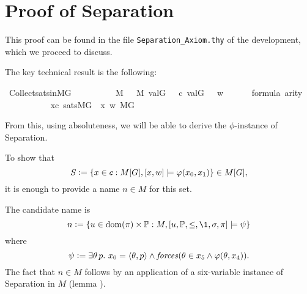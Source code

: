 \section{Proof of Separation}

This proof can be found in the file \verb|Separation_Axiom.thy| of the
development, which we proceed to discuss.

The key technical result is the following:
\begin{isabelle}
  \isamarkupfalse%
  \ Collect{\isacharunderscore}sats{\isacharunderscore}in{\isacharunderscore}MG\ {\isacharcolon}\isanewline
  \ \ \isanewline
  \ \ \ \ {\isachardoublequoteopen}{\isasympi}\ {\isasymin}\ M{\isachardoublequoteclose}\ {\isachardoublequoteopen}{\isasymsigma}\ {\isasymin}\ M{\isachardoublequoteclose}\ {\isachardoublequoteopen}val{\isacharparenleft}G{\isacharcomma}\ {\isasympi}{\isacharparenright}\ {\isacharequal}\ c{\isachardoublequoteclose}\ {\isachardoublequoteopen}val{\isacharparenleft}G{\isacharcomma}\ {\isasymsigma}{\isacharparenright}\ {\isacharequal}\ w{\isachardoublequoteclose}\isanewline
  \ \ \ \ {\isachardoublequoteopen}{\isasymphi}\ {\isasymin}\ formula{\isachardoublequoteclose}\ {\isachardoublequoteopen}arity{\isacharparenleft}{\isasymphi}{\isacharparenright}\ {\isasymle}\ {}{\isachardoublequoteclose}\isanewline
  \ \ \ \ \ \ \isanewline
  \ \ \ \ {\isachardoublequoteopen}{\isacharbraceleft}x{\isasymin}c{\isachardot}\ sats{\isacharparenleft}M{\isacharbrackleft}G{\isacharbrackright}{\isacharcomma}\ {\isasymphi}{\isacharcomma}\ {\isacharbrackleft}x{\isacharcomma}\ w{\isacharbrackright}{\isacharparenright}{\isacharbraceright}{\isasymin}\ M{\isacharbrackleft}G{\isacharbrackright}{\isachardoublequoteclose}
\end{isabelle}
%
From this, using absoluteness, we will be able to derive the
$\phi$-instance of Separation. 

To show that   
\[
S\mathrel{\mathop:}=\{x\in c : M[G],[x,w]\models \varphi(x_0,x_1)\} \in M[G],
\]
it is enough to provide a name $n\in M$ for this set.
 
The candidate name is
\[
n \defi \{u \in\dom(\pi)\times\PP :M,[u,\PP,\leq,\1,\sig,\pi]\models \psi\}
\]
where
\[
\psi \defi \exists \th\, p.\ x_0=\lb\th,p\rb \y 
   \forceisa(\th\in x_5\y\phi(\th,x_4)).
\]
The fact that $n\in M$ follows by an application of a six-variable
instance of Separation in $M$ (lemma ).


